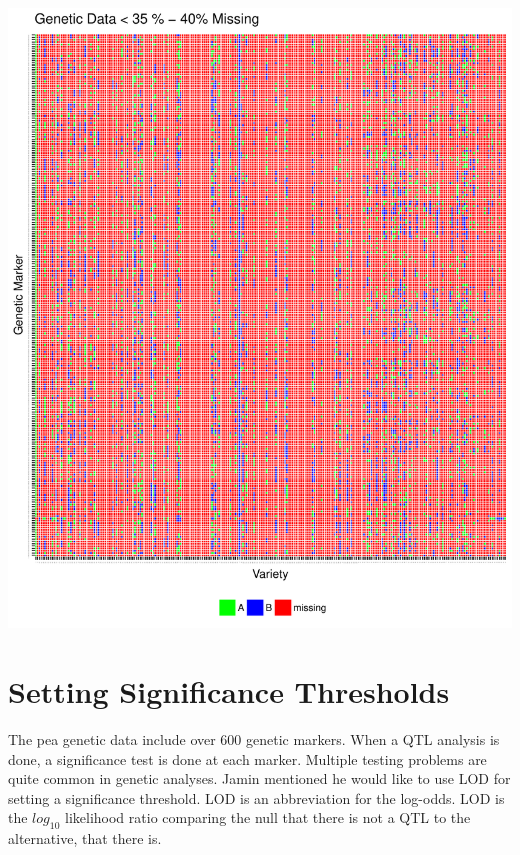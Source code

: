 \documentclass[11pt]{article}\usepackage[]{graphicx}\usepackage[]{color}
\makeatletter
\def\maxwidth{ %
  \ifdim\Gin@nat@width>\linewidth
    \linewidth
  \else
    \Gin@nat@width
  \fi
}
\newenvironment{knitrout}{}{} %
\makeatother
\begin{document}
\begin{knitrout}\footnotesize
{}\color{fgcolor}

{\centering \includegraphics[width=\maxwidth]{figure/missing_plot40-1} 

}



\end{knitrout}












\section{Setting Significance Thresholds}

The pea genetic data include over 600 genetic markers. When a QTL analysis is done, a significance test is done at each marker. Multiple testing problems are quite common in genetic analyses. Jamin mentioned he would like to use LOD for setting a significance threshold. LOD is an abbreviation for the log-odds. LOD is the $log_{10}$ likelihood ratio comparing the null that there is not a QTL to the alternative, that there is.
\end{document}
